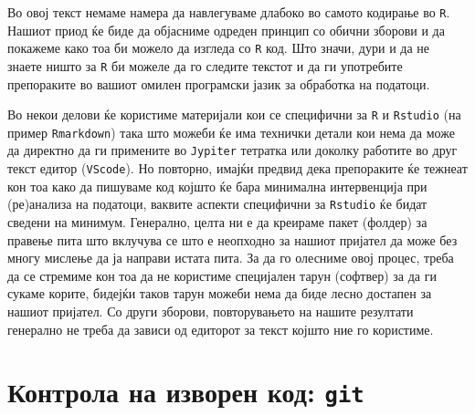 \documentclass[
]{book}
\begin{document}
Во овој текст немаме намера да навлегуваме длабоко во самото кодирање во \texttt{R}. Нашиот приод ќе биде да објасниме одреден принцип со обични зборови и да покажеме како тоа би можело да изгледа со \texttt{R} код. Што значи, дури и да не знаете ништо за \texttt{R} би можеле да го следите текстот и да ги употребите препораките во вашиот омилен програмски јазик за обработка на податоци.

Во некои делови ќе користиме материјали кои се специфични за \texttt{R} и \texttt{Rstudio} (на пример \texttt{Rmarkdown}) така што можеби ќе има технички детали кои нема да може да директно да ги примените во \texttt{Jypiter} тетратка или доколку работите во друг текст едитор (\texttt{VScode}). Но повторно, имајќи предвид дека препораките ќе тежнеат кон тоа како да пишуваме код којшто ќе бара минимална интервенција при (ре)анализа на податоци, ваквите аспекти специфични за \texttt{Rstudio} ќе бидат сведени на минимум. Генерално, целта ни е да креираме пакет (фолдер) за правење пита што вклучува се што е неопходно за нашиот пријател да може без многу мислење да ја направи истата пита. За да го олесниме овој процес, треба да се стремиме кон тоа да не користиме специјален тарун (софтвер) за да ги сукаме корите, бидејќи таков тарун можеби нема да биде лесно достапен за нашиот пријател. Со други зборови, повторувањето на нашите резултати генерално не треба да зависи од едиторот за текст којшто ние го користиме.

\hypertarget{ux43aux43eux43dux442ux440ux43eux43bux430-ux43dux430-ux438ux437ux432ux43eux440ux435ux43d-ux43aux43eux434-git}{%
\section{\texorpdfstring{Контрола на изворен код: \texttt{git}}{Контрола на изворен код: git}}\label{ux43aux43eux43dux442ux440ux43eux43bux430-ux43dux430-ux438ux437ux432ux43eux440ux435ux43d-ux43aux43eux434-git}}
\end{document}
